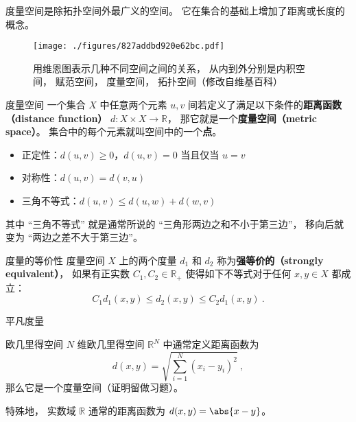 

度量空间是除拓扑空间外最广义的空间。 它在集合的基础上增加了距离或长度的概念。
\begin{figure}[ht]
\centering
\texttt{[image: ./figures/827addbd920e62bc.pdf]}
\caption{用维恩图表示几种不同空间之间的关系， 从内到外分别是内积空间， 赋范空间， 度量空间， 拓扑空间（修改自维基百科）} \label{fig_Metric_2}
\end{figure}

\begin{definition}{度量空间}\label{def_Metric_2}
一个集合 $X$ 中任意两个元素 $u, v$ 间若定义了满足以下条件的\textbf{距离函数（distance function）} $d: X \times X \to \mathbb{R}$， 那它就是一个\textbf{度量空间（metric space）}。 集合中的每个元素就叫空间中的一个\textbf{点}。
\begin{itemize}
\item 正定性：$d(u, v) \geq 0$，$d(u, v)=0$ 当且仅当 $u=v$
\item 对称性：$d(u, v) = d(v, u)$
\item 三角不等式：$d(u, v) \leqslant d(u, w) + d(w, v)$
\end{itemize}
\end{definition}
\addTODO{距离有$[0, +\infty)$和$[0, \infty]$两种定义，在强等价的意义下可以互相转换。}

其中 “三角不等式” 就是通常所说的 “三角形两边之和不小于第三边”， 移向后就变为 “两边之差不大于第三边”。

\begin{definition}{度量的等价性}
度量空间 $X$ 上的两个度量 $d_1$ 和 $d_2$ 称为\textbf{强等价的（strongly equivalent）}， 如果有正实数 $C_1, C_2 \in \mathbb{R}_+$ 使得如下不等式对于任何 $x, y \in X$ 都成立：
$$
C_1 d_1(x, y) \leq d_2(x, y) \leq C_2 d_1(x, y)~.
$$
\end{definition}

\begin{example}{平凡度量}
\end{example}


\begin{example}{欧几里得空间}\label{ex_Metric_1}
$N$ 维欧几里得空间 $\mathbb R^N$ 中通常定义距离函数为
\begin{equation}\label{eq_Metric_1}
d(x, y) = \sqrt{\sum_{i=1}^N (x_i - y_i)^2}~,
\end{equation}
那么它是一个度量空间（证明留做习题）。

特殊地， 实数域 $\mathbb R$ 通常的距离函数为 $d(x, y) = \abs{x - y}$。
\end{example}

